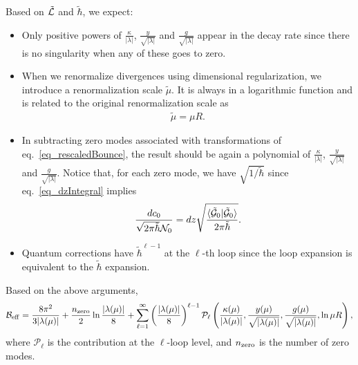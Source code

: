 \documentclass[12pt]{article}
\begin{document}
Based on $\tilde{\cal L}$ and $\tilde{\hbar}$, we expect:
\begin{itemize}
\item Only positive powers of $\frac{\kappa}{|\lambda|}$,
  $\frac{y}{\sqrt{|\lambda|}}$ and $\frac{g}{\sqrt{|\lambda|}}$ appear
  in the decay rate since there is no singularity when any of these
  goes to zero.
\item When we renormalize divergences using dimensional
  regularization, we introduce a renormalization scale $\tilde\mu$.
  It is always in a logarithmic function and is related to the
  original renormalization scale as
  \begin{align}
    \tilde\mu = \mu R.
  \end{align}
\item In subtracting zero modes associated with transformations of
  eq.~\eqref{eq_rescaledBounce}, the result should be again a
  polynomial of $\frac{\kappa}{|\lambda|}$,
  $\frac{y}{\sqrt{|\lambda|}}$ and
  $\frac{g}{\sqrt{|\lambda|}}$. Notice that, for each zero mode, we
  have $\sqrt{1/\tilde{\hbar}}$ since eq.~\eqref{eq_dzIntegral}
  implies
  \begin{align}
    \frac{dc_0}{\sqrt{2\pi\tilde{\hbar}}\mathcal N_0}
    = dz
    \sqrt{\frac{\langle\tilde {{\cal G}}_0|\tilde {{\cal G}}_0\rangle}{2\pi\tilde{\hbar}}}.
  \end{align}
\item Quantum corrections have $\tilde{\hbar}^{\ell -1}$ at the
  $\ell$-th loop since the loop expansion is equivalent to the
  $\tilde{\hbar}$ expansion.
\end{itemize}

Based on the above arguments, 
\begin{align}
 \mathcal B_{\rm eff}
  = 
  \frac{8\pi^2}{3|\lambda (\mu)|}
  + \frac{n_{\rm zero}}{2} \ln\frac{|\lambda (\mu)|}{8}
  + \sum_{\ell =1}^{\infty}
  \left(
    \frac{|\lambda (\mu)|}{8}
  \right)^{\ell-1}\mathcal P_\ell
  \left(
    \frac{\kappa (\mu)}{|\lambda (\mu)|},
    \frac{y (\mu)}{\sqrt{|\lambda (\mu)|}},
    \frac{g (\mu)}{\sqrt{|\lambda (\mu)|}},
    \ln \mu R
  \right),
  \label{B_eff}
\end{align}
where $\mathcal P_\ell$ is the contribution at the $\ell$-loop level,
and $n_{\rm zero}$ is the number of zero modes.
\end{document}
